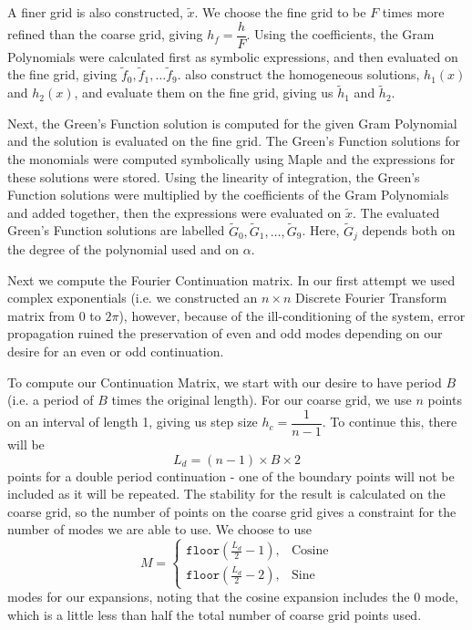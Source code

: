 \documentclass[11pt]{amsart}
\begin{document}
A finer grid is also constructed, $\tilde{x}$.  We choose the fine grid to be $F$ times more refined than the coarse grid, giving $h_f=\dfrac{h}{F}$.  Using the coefficients, the Gram Polynomials were calculated first as symbolic expressions, and then evaluated on the fine grid, giving  $\tilde{f}_0,\tilde{f}_1,\ldots \tilde{f}_9 $.  also construct the homogeneous solutions, $h_1(x)$ and $h_2(x)$, and evaluate them on the fine grid, giving us $\tilde{h}_1$ and $\tilde{h}_2$.  

Next, the Green's Function solution is computed for the given Gram Polynomial and the solution is evaluated on the fine grid. The Green's Function solutions for the monomials were computed symbolically using Maple and the expressions for these solutions were stored.  Using the linearity of integration, the Green's Function solutions were multiplied by the coefficients of the Gram Polynomials and added together,  then  the expressions were evaluated on $\tilde{x}$.  The evaluated Green's Function solutions are labelled  $\tilde{G}_0,\tilde{G}_1,\ldots,\tilde{G}_9$.  Here, $\tilde{G}_j$ depends both on the degree of the polynomial used and on $\alpha$. 

Next we compute the Fourier Continuation matrix.  In our first attempt we used complex exponentials (i.e. we constructed an $n \times n$ Discrete Fourier Transform matrix from $0$ to $2\pi$), however, because of the ill-conditioning of the system, error propagation ruined the preservation of even and odd modes depending on our desire for an even or odd continuation.  

To compute our Continuation Matrix, we start with our desire to have period $B$ (i.e. a period of $B$ times the original length). For our coarse grid, we use $n$ points on an interval of length 1, giving us step size $h_c=\dfrac{1}{n-1}$.  To continue this,  there will be  
\begin{equation}
L_d=(n-1)\times B \times 2
\end{equation}
 points for a double period continuation - one of the boundary points will not be included as it will be repeated.  The stability for the result is calculated on the coarse grid, so the number of points on the coarse grid gives a constraint for the number of modes we are able to use.  We choose to use 
 \begin{equation}
 M=\begin{cases}
 \texttt{floor}(\frac{L_d}{2}-1), & \text{Cosine} \\
 \texttt{floor}(\frac{L_d}{2}-2), & \text{Sine}
 \end{cases}
 \end{equation}
 modes for our expansions, noting that the cosine expansion includes the 0 mode, which is a little less than half the total number of coarse grid points used. 
\end{document}
